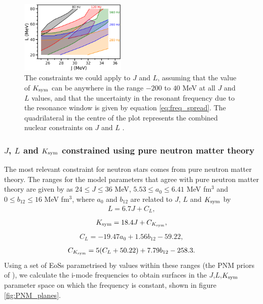 \documentclass[fleqn,usenatbib]{mnras}
\begin{document}
\begin{figure}
\centering
\includegraphics[width=0.45\textwidth,angle=0]{grid_JL_Kdfspread.png}
\caption{The constraints we could apply to $J$ and $L$, assuming that the value of $K_{\rm sym}$ can be anywhere in the range $-200$ to $40$ MeV at all $J$ and $L$ values, and that the uncertainty in the resonant frequency due to the resonance window is given by equation \ref{eq:freq_spread}. The quadrilateral in the centre of the plot represents the combined nuclear constraints on $J$ and $L$ \citet{lattimer2013constraining}.}
\label{fig:all_constraints}
\end{figure}









\subsubsection{$J$, $L$ and $K_{\rm sym}$ constrained using pure neutron matter theory}\label{subsec4_1_2}
\hspace{\parindent}The most relevant constraint for neutron stars comes from pure neutron matter theory. The ranges for the model parameters that agree with pure neutron matter theory are given by \citet{holt2018universal} as $24\leq J\leq 36$ MeV, $5.53\leq a_0\leq 6.41$ MeV fm$^3$ and $0\leq b_{12}\leq 16$ MeV fm$^3$, where $a_0$ and $b_{12}$ are related to $J$, $L$ and $K_{\rm sym}$ by \citep{newton2020nuclear}
\begin{align}
L=6.7J+C_L,
\end{align}
\begin{align}
K_{\rm sym}=18.4J+C_{K_{\rm sym}},
\end{align}
\begin{align}
C_L=-19.47a_0+1.56b_{12}-59.22,
\end{align}
\begin{align}
C_{K_{\rm sym}}=5(C_L+50.22)+7.79b_{12}-258.3.
\end{align}
\noindent Using a set of EoSs parametrised by values within these ranges (the PNM priors of \citet{newton2020nuclear}), we calculate the i-mode frequencies to obtain surfaces in the $J$,$L$,$K_{\rm sym}$ parameter space on which the frequency is constant, shown in figure \ref{fig:PNM_planes}. 
\end{document}
